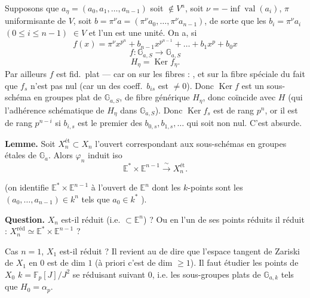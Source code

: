 \documentclass[11pt,a4paper]{article}
\begin{document}
Supposons que $a_\eta = (a_0, a_1, \dots, a_{n-1})$ soit $\notin V^n$,
\struck{\ill{}} soit $\nu = -\inf \operatorname{val}(a_i)$, $\pi$ uniformisante de $V$,
soit $b = \pi^\nu a = (\pi^\nu a_0, \dots, \pi^\nu a_{n-1})$, de sorte que les
$b_i = \pi^\nu a_i$  $(0 \leqslant i \leqslant n-1)$  $\in V$
et l'un est une unité. On a, si
\[
  f(x) = \pi^\nu x^{p^n} + b_{n-1}x^{p^{n-1}} + \dots + b_1 x^p + b_0 x
\]
\[
  f : \mathbb{G}_{a,S} \longrightarrow \mathbb{G}_{a,S}
\]
\[
  H_\eta = \operatorname{Ker} f_\eta .
\]
Par ailleurs $f$ est \struck{\ill{}} fid.\ plat --- car on \ill{} sur les fibres :
, et sur la fibre spéciale  du fait
que $f_s$ n'est pas nul (car un des coeff.\ $b_{i s}$ est $\neq 0$). Donc
$\operatorname{Ker} f$ est un sous-schéma en groupes  plat de $\mathbb{G}_{a,S}$,
de fibre générique $H_\eta$, donc coïncide avec $H$
 (qui  l'adhérence schématique de $H_\eta$ dans $\mathbb{G}_{a,S}$).
Donc $\operatorname{Ker} f_s$ est de rang $p^n$, or il est de rang $p^{n-i}$ si
$b_{i,s}$ est le premier des $b_{0,s}, b_{1,s}, \dots$ qui soit non nul.
C'est absurde.

\textbf{Lemme.} Soit $X_n^{\text{ét}} \subset X_n$ l'ouvert correspondant
aux sous-schémas en groupes étales de $\mathbb{G}_a$. Alors $\varphi_n$ induit iso
\[
  \mathbb{E}^* \times \mathbb{E}^{n-1} \xrightarrow{\ \sim\ } X_n^{\text{ét}} .
\]

(on identifie $\mathbb{E}^* \times \mathbb{E}^{n-1}$ à l'ouvert de $\mathbb{E}^n$ dont
les \struck{\ill{}} $k$-points sont les $(a_0, \dots, a_{n-1}) \in k^n$ tels que
$a_0 \in k^*$ \ill{}).

\textbf{Question.} $X_n$ est-il réduit (i.e.  $\subset \mathbb{E}^n$) ?
Ou en  l'un de ses points réduits \ill{} il réduit :
$X_n^{\mathrm{réd}} \simeq \mathbb{E}^* \times \mathbb{E}^{n-1}$ ?

Cas $n = 1$, $X_1$ est-il réduit   ?
Il revient au  de dire que l'espace tangent de Zariski de $X_1$
en $0$ est de dim $1$ (à priori c'est de dim $\geqslant 1$).  Il faut
étudier les points de $X_0$  $k = \mathbb{F}_p[J]/J^2$
se réduisant suivant $0$, i.e. les sous-groupes plats  de
$\mathbb{G}_{a,k}$ tels que $H_0 = \alpha_p$.
\end{document}

